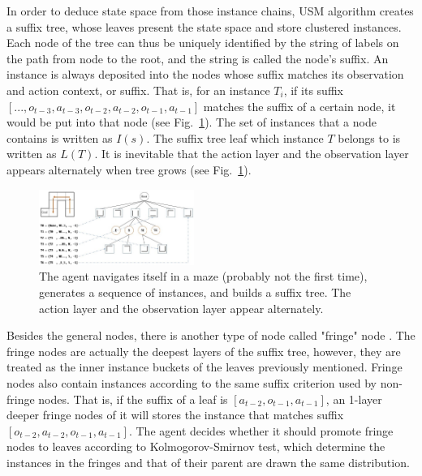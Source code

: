 \documentclass[conference]{IEEEtran}
\begin{document}
	In order to deduce state space from those instance chains, USM algorithm creates a suffix tree,
	whose leaves present the state space and store clustered instances. Each node of the tree
	can thus be uniquely identified by the string of labels on the path from node to the root,
	and the string is called the node’s suffix. An instance is always deposited into the
	nodes whose suffix matches its observation and action context, or suffix. That is,
	for an instance $T_i$, if its suffix $[..., o_{t-3}, a_{t-3}, o_{t-2}, a_{t-2}, o_{t-1}, a_{t-1}]$
	matches the suffix of a certain node, it would be put into that node (see Fig.~\ref{fig:suffix tree}).
	The set of instances that a node contains is written as $I(s)$. The suffix tree leaf which
	instance $T$ belongs to is written as $L(T)$. It is inevitable that the action layer and
	the observation layer appears alternately when tree grows (see Fig.~\ref{fig:suffix tree}).
	
	
	
	\begin{figure}[b]
		\centering
		\includegraphics[width=0.45\textwidth]{usm_sample.jpg}
		\caption{The agent navigates itself in a maze (probably not the first time), generates
			a sequence of instances, and builds a suffix tree. The action layer and
			the observation layer appear alternately.}
		\label{fig:suffix tree}
	\end{figure}
	
	
	
	Besides the general nodes, there is another type of node called "fringe" node \cite{mccallum1995instance}.
	The fringe nodes are actually the deepest layers of the suffix tree, however, they are treated as 
	the inner instance buckets of the leaves previously mentioned. Fringe nodes also contain
	instances according to the same suffix criterion used by non-fringe nodes. That is, 
	if the suffix of a leaf is $[a_{t-2}, o_{t-1}, a_{t-1}]$, an 1-layer deeper fringe nodes of it
	will stores the instance that matches suffix $[o_{t-2}, a_{t-2}, o_{t-1}, a_{t-1}]$. The agent decides
	whether it should promote fringe nodes to leaves according to Kolmogorov-Smirnov test, which determine the
	instances in the fringes and that of their parent are drawn the same distribution.
	
\end{document}
